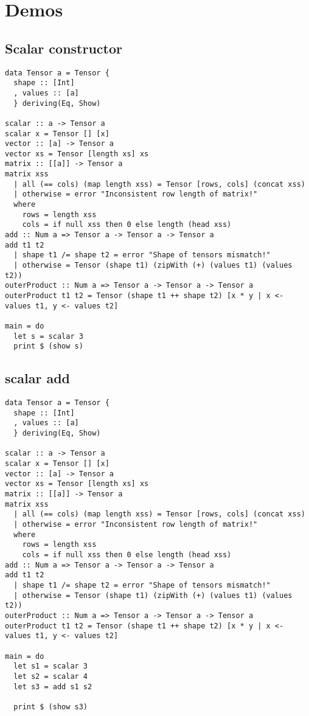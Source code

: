\documentclass[11pt]{article}
\begin{document}
\section{Demos}
\label{sec:orga0f7a20}
\subsection{Scalar constructor}
\label{sec:org935fa67}
\begin{verbatim}
data Tensor a = Tensor {
  shape :: [Int] 
  , values :: [a]
  } deriving(Eq, Show)

scalar :: a -> Tensor a
scalar x = Tensor [] [x]
vector :: [a] -> Tensor a
vector xs = Tensor [length xs] xs
matrix :: [[a]] -> Tensor a
matrix xss
  | all (== cols) (map length xss) = Tensor [rows, cols] (concat xss)
  | otherwise = error "Inconsistent row length of matrix!"
  where
    rows = length xss
    cols = if null xss then 0 else length (head xss)
add :: Num a => Tensor a -> Tensor a -> Tensor a
add t1 t2
  | shape t1 /= shape t2 = error "Shape of tensors mismatch!"
  | otherwise = Tensor (shape t1) (zipWith (+) (values t1) (values t2))
outerProduct :: Num a => Tensor a -> Tensor a -> Tensor a
outerProduct t1 t2 = Tensor (shape t1 ++ shape t2) [x * y | x <- values t1, y <- values t2]

main = do
  let s = scalar 3
  print $ (show s)
\end{verbatim}

\subsection{scalar add}
\label{sec:org6d6f5a3}
\begin{verbatim}
data Tensor a = Tensor {
  shape :: [Int] 
  , values :: [a]
  } deriving(Eq, Show)

scalar :: a -> Tensor a
scalar x = Tensor [] [x]
vector :: [a] -> Tensor a
vector xs = Tensor [length xs] xs
matrix :: [[a]] -> Tensor a
matrix xss
  | all (== cols) (map length xss) = Tensor [rows, cols] (concat xss)
  | otherwise = error "Inconsistent row length of matrix!"
  where
    rows = length xss
    cols = if null xss then 0 else length (head xss)
add :: Num a => Tensor a -> Tensor a -> Tensor a
add t1 t2
  | shape t1 /= shape t2 = error "Shape of tensors mismatch!"
  | otherwise = Tensor (shape t1) (zipWith (+) (values t1) (values t2))
outerProduct :: Num a => Tensor a -> Tensor a -> Tensor a
outerProduct t1 t2 = Tensor (shape t1 ++ shape t2) [x * y | x <- values t1, y <- values t2]

main = do
  let s1 = scalar 3
  let s2 = scalar 4
  let s3 = add s1 s2

  print $ (show s3)
\end{verbatim}
\end{document}
